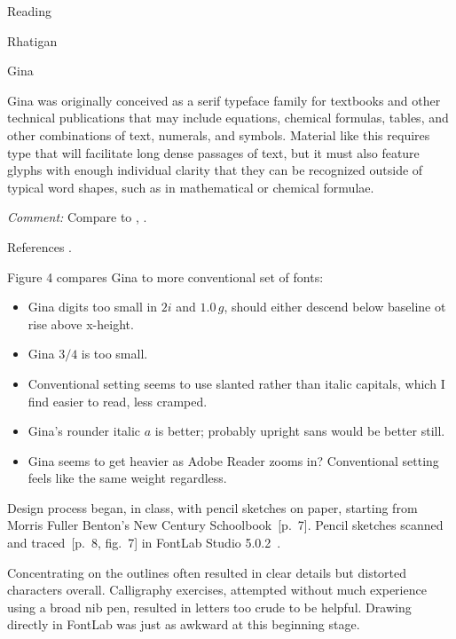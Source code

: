 \documentclass[11pt]{PalisadesLakesBook}
\begin{document}
\begin{plSection}{Reading}
\begin{plSection}{Rhatigan}
\begin{plSection}{Gina}
\begin{plSection}{}
\begin{plQuote}{}{}
Gina was originally conceived as a serif typeface family
for textbooks and other technical publications that may include
equations, chemical formulas, tables, and other combinations of
text, numerals, and symbols.
Material like this requires type that will facilitate long dense
passages of text, but it must also feature glyphs with enough
individual clarity that they can be recognized outside of typical
word shapes, such as in mathematical or chemical formulae.
\end{plQuote}

\emph{Comment:} 
Compare to ,
.

References .

Figure 4 compares Gina to more conventional set of fonts:
\begin{itemize}
  \item Gina digits too small in $2i$ and $1.0\,g$, 
  should either descend below baseline ot rise above x-height.
  \item Gina $3/4$ is too small.
  \item Conventional setting seems to use slanted rather 
  than italic capitals, which I find easier to read, less cramped.
  \item Gina's rounder italic $\mathit{a}$ is better; 
  probably upright sans would be better still.
  \item Gina seems to get heavier as Adobe Reader zooms in?
  Conventional setting feels like the same weight regardless. 
\end{itemize}

Design process began, in class, with pencil sketches on paper,
starting from Morris Fuller Benton's New Century 
Schoolbook~[p.~7].
Pencil sketches scanned and traced~[p.~8, fig.~7] 
in FontLab Studio 5.0.2~\cite{FontLab:2021}.

\begin{plQuote}{}{}
Concentrating on the outlines often resulted in clear details
but distorted characters overall.
Calligraphy exercises, attempted without much experience 
using a broad nib pen, resulted in letters too crude
to be helpful. Drawing directly in FontLab was just as awkward
at this beginning stage.


\end{plQuote}
\end{plSection}
\end{plSection}
\end{plSection}
\end{plSection}
\end{document}
